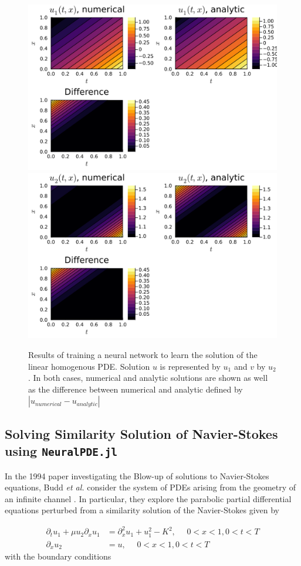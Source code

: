 \documentclass{CUP-JNL-DTM}%
\theoremstyle{definition}
\numberwithin{equation}{section}
\begin{document}
\begin{figure}
\centering
	\includegraphics[width=0.48\linewidth]{figures/linear_homo_PDE_plots/solution_1.png}
	\includegraphics[width=0.48\linewidth]{figures/linear_homo_PDE_plots/solution_2.png}
	\caption{Results of training a neural network to learn the solution of the linear homogenous PDE. Solution $u$ is represented by $u_1$ and $v$ by $u_2$. In both cases, numerical and analytic solutions are shown as well as the difference between numerical and analytic defined by $|u_{numerical} - u_{analytic}|$}
	\label{fig:results_linear}
\end{figure}

\subsection{Solving Similarity Solution of Navier-Stokes using \texttt{NeuralPDE.jl}}

In the 1994 paper investigating the Blow-up of solutions to Navier-Stokes equations, Budd \textit{et al.} consider the system of PDEs arising from the geometry of an infinite channel \cite{buddBlowupSystemPartial1994}. In particular, they explore the parabolic partial differential equations perturbed from a similarity solution of the Navier-Stokes given by

\begin{equation}
\begin{split}
    \partial_t u_1 + \mu u_2 \partial_x u_1 & = \partial^2_{x} u_1 + u_1^2 - K^2, \,\,\,\,\,\,\,\, 0 < x < 1, 0 < t < T \\
    \partial_x u_2 & = u, \,\,\,\,\,\,\,\, 0 < x < 1, 0 < t < T
    \label{eqn:ns_problem}
\end{split}
\end{equation}
with the boundary conditions 
\end{document}
